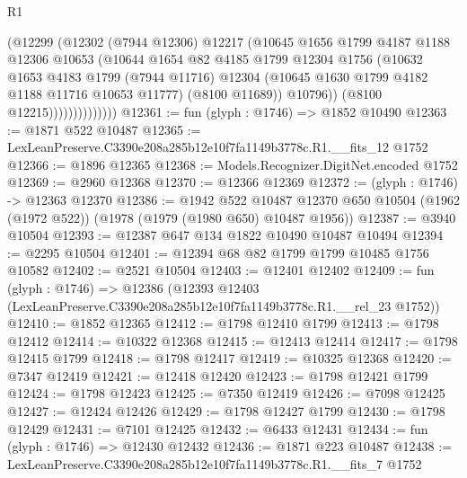 \begin{lexlean}{R1}
\begin{coremodule}
                          (@12299
                            (@12302
                              (@7944 @12306)
                              @12217
                              (@10645
                                @1656
                                @1799
                                @4187
                                @1188
                                @12306
                                @10653
                                (@10644
                                  @1654
                                  @82
                                  @4185
                                  @1799
                                  @12304
                                  @1756
                                  (@10632
                                    @1653
                                    @4183
                                    @1799
                                    (@7944 @11716)
                                    @12304
                                    (@10645 @1630 @1799 @4182 @1188 @11716 @10653 @11777)
                                    (@8100 @11689))
                                  @10796))
                              (@8100 @12215))))))))))))))
@12361 := fun (glyph : @1746) => @1852 @10490
@12363 := @1871 @522 @10487
@12365 := LexLeanPreserve.C3390e208a285b12e10f7fa1149b3778c.R1.__fits_12 @1752
@12366 := @1896 @12365
@12368 := Models.Recognizer.DigitNet.encoded @1752
@12369 := @2960 @12368
@12370 := @12366 @12369
@12372 := (glyph : @1746) -> @12363 @12370
@12386 := @1942
    @522
    @10487
    @12370
    @650
    @10504
    (@1962 (@1972 @522))
    (@1978 (@1979 (@1980 @650) @10487 @1956))
@12387 := @3940 @10504
@12393 := @12387 @647 @134 @1822 @10490 @10487 @10494
@12394 := @2295 @10504
@12401 := @12394 @68 @82 @1799 @1799 @10485 @1756 @10582
@12402 := @2521 @10504
@12403 := @12401 @12402
@12409 := fun (glyph : @1746) =>
  @12386 (@12393 @12403 (LexLeanPreserve.C3390e208a285b12e10f7fa1149b3778c.R1.__rel_23 @1752))
@12410 := @1852 @12365
@12412 := @1798 @12410 @1799
@12413 := @1798 @12412
@12414 := @10322 @12368
@12415 := @12413 @12414
@12417 := @1798 @12415 @1799
@12418 := @1798 @12417
@12419 := @10325 @12368
@12420 := @7347 @12419
@12421 := @12418 @12420
@12423 := @1798 @12421 @1799
@12424 := @1798 @12423
@12425 := @7350 @12419
@12426 := @7098 @12425
@12427 := @12424 @12426
@12429 := @1798 @12427 @1799
@12430 := @1798 @12429
@12431 := @7101 @12425
@12432 := @6433 @12431
@12434 := fun (glyph : @1746) => @12430 @12432
@12436 := @1871 @223 @10487
@12438 := LexLeanPreserve.C3390e208a285b12e10f7fa1149b3778c.R1.__fits_7 @1752

\end{coremodule}
\end{lexlean}

